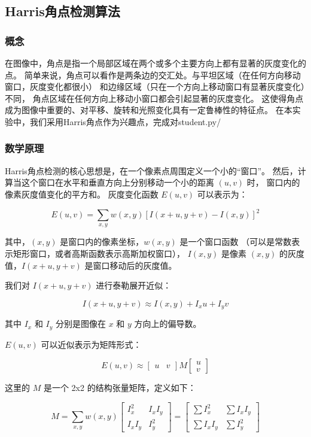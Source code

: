 \subsection{Harris角点检测算法}
\subsubsection{概念}
在图像中，角点是指一个局部区域在两个或多个主要方向上都有显著的灰度变化的点。
简单来说，角点可以看作是两条边的交汇处。与平坦区域（在任何方向移动窗口，灰度变化都很小）
和边缘区域（只在一个方向上移动窗口有显著灰度变化）不同，
角点区域在任何方向上移动小窗口都会引起显著的灰度变化。
这使得角点成为图像中重要的、对平移、旋转和光照变化具有一定鲁棒性的特征点。
在本实验中，我们采用Harris角点作为兴趣点，完成对student.py/
\subsubsection{数学原理}
Harris角点检测的核心思想是，在一个像素点周围定义一个小的“窗口”。
然后，计算当这个窗口在水平和垂直方向上分别移动一个小的距离 \((u, v)\) 时，
窗口内的像素灰度值变化的平方和。
灰度变化函数 \(E(u,v)\) 可以表示为：

\[ E(u,v) = \sum_{x,y} w(x,y) [I(x+u, y+v) - I(x,y)]^2 \]
    
其中，\((x,y)\) 是窗口内的像素坐标，\(w(x,y)\) 是一个窗口函数
（可以是常数表示矩形窗口，或者高斯函数表示高斯加权窗口），
\(I(x,y)\) 是像素 \((x,y)\) 的灰度值，\(I(x+u, y+v)\) 是窗口移动后的灰度值。

我们对 \(I(x+u, y+v)\) 进行泰勒展开近似：
    
\[ I(x+u, y+v) \approx I(x,y) + I_x u + I_y v \]
    
其中 \(I_x\) 和 \(I_y\) 分别是图像在 \(x\) 和 \(y\) 方向上的偏导数。

    
\(E(u,v)\) 可以近似表示为矩阵形式：
    
\[ E(u,v) \approx \begin{bmatrix} u & v \end{bmatrix} M \begin{bmatrix} u \\ v \end{bmatrix} \]
    
这里的 \(M\) 是一个 2x2 的结构张量矩阵，定义如下：
    
\[ M = \sum_{x,y} w(x,y) \begin{bmatrix} I_x^2 & I_x I_y \\ I_x I_y & I_y^2 \end{bmatrix} = \begin{bmatrix} \sum I_x^2 & \sum I_x I_y \\ \sum I_x I_y & \sum I_y^2 \end{bmatrix} \]
 
